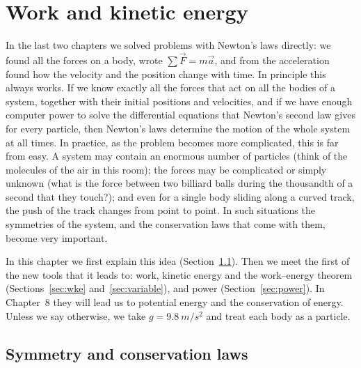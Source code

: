 \documentclass[11pt,a4paper]{article}
\begin{document}
\makenotetitle

\setcounter{section}{6}
\section{Work and kinetic energy}\label{sec:work}

In the last two chapters we solved problems with Newton's laws directly: we found all the forces on
a body, wrote $\sum\vec{F} = m\vec{a}$, and from the acceleration found how the velocity and the
position change with time. In principle this always works. If we know exactly all the forces that
act on all the bodies of a system, together with their initial positions and velocities, and if we
have enough computer power to solve the differential equations that Newton's second law gives for
every particle, then Newton's laws determine the motion of the whole system at all times. In
practice, as the problem becomes more complicated, this is far from easy. A system may contain an
enormous number of particles (think of the molecules of the air in this room); the forces may be
complicated or simply unknown (what is the force between two billiard balls during the thousandth
of a second that they touch?); and even for a single body sliding along a curved track, the push of
the track changes from point to point. In such situations the symmetries of the system, and the
conservation laws that come with them, become very important.

In this chapter we first explain this idea (Section~\ref{sec:symmetry}). Then we meet the first of
the new tools that it leads to: work, kinetic energy and the work--energy theorem
(Sections~\ref{sec:wke} and~\ref{sec:variable}), and power (Section~\ref{sec:power}). In Chapter~8
they will lead us to potential energy and the conservation of energy. Unless we say otherwise, we
take $g = \qty{9.8}{m/s^2}$ and treat each body as a particle.

\subsection{Symmetry and conservation laws}\label{sec:symmetry}
\end{document}
